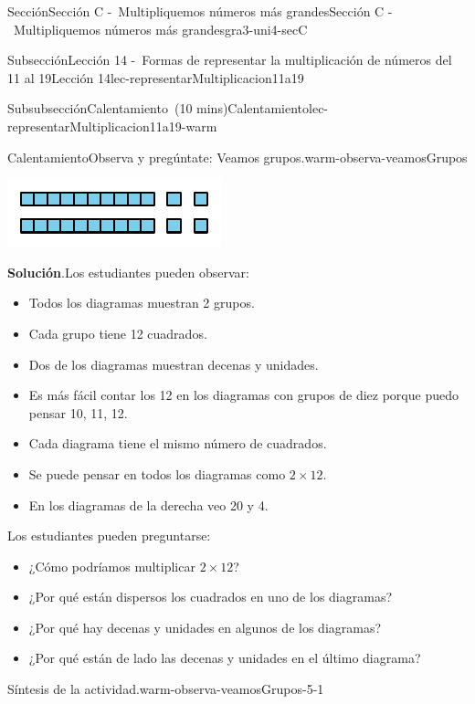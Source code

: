 \documentclass[oneside,10pt,]{article}
\newcommand{\blocktitlefont}{\relax}
\begin{document}
\begin{sectionptx}{Sección}{Sección C -~Multipliquemos números más grandes}{}{Sección C -~Multipliquemos números más grandes}{}{}{gra3-uni4-secC}
\begin{subsectionptx}{Subsección}{Lección 14 -~Formas de representar la multiplicación de números del 11 al 19}{}{Lección 14}{}{}{lec-representarMultiplicacion11a19}
\begin{subsubsectionptx}{Subsubsección}{Calentamiento~(10 mins)}{}{Calentamiento}{}{}{lec-representarMultiplicacion11a19-warm}
\begin{exploration}{Calentamiento}{Observa y pregúntate: Veamos grupos.}{warm-observa-veamosGrupos}
\begin{sidebyside}{3}{0}{0}{0}
\begin{sbspanel}{0.333333333333333}
\includegraphics[width=\linewidth]{external/svg-source/tikz-file-141822-scale13.pdf}
\end{sbspanel}%
\end{sidebyside}%
\par\smallskip%
\noindent\textbf{\blocktitlefont Solución}.\hypertarget{warm-observa-veamosGrupos-3}{}\quad{}Los estudiantes pueden observar:%
%
\begin{itemize}[label=\textbullet]
\item{}Todos los diagramas muestran 2 grupos.%
\item{}Cada grupo tiene 12 cuadrados.%
\item{}Dos de los diagramas muestran decenas y unidades.%
\item{}Es más fácil contar los 12 en los diagramas con grupos de diez porque puedo pensar 10, 11, 12.%
\item{}Cada diagrama tiene el mismo número de cuadrados.%
\item{}Se puede pensar en todos los diagramas como \(2 \times 12\).%
\item{}En los diagramas de la derecha veo 20 y 4.%
\end{itemize}
Los estudiantes pueden preguntarse:%
%
\begin{itemize}[label=\textbullet]
\item{}¿Cómo podríamos multiplicar \(2 \times 12\)?%
\item{}¿Por qué están dispersos los cuadrados en uno de los diagramas?%
\item{}¿Por qué hay decenas y unidades en algunos de los diagramas?%
\item{}¿Por qué están de lado las decenas y unidades en el último diagrama?%
\end{itemize}
\end{exploration}%
\par
\begin{paragraphs}{Síntesis de la actividad.}{warm-observa-veamosGrupos-5-1}%
%
\begin{itemize}[label=\textbullet]

\end{itemize}
\end{paragraphs}
\end{subsubsectionptx}
\end{subsectionptx}
\end{sectionptx}
\end{document}
